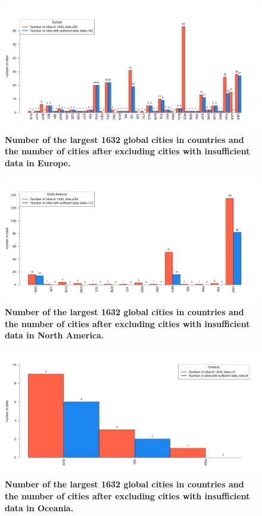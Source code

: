 \documentclass[preprint,10pt]{elsarticle} %
\begin{document}
\begin{figure}
\centering
\includegraphics[trim={ 0 35 25 50 },clip,scale=0.45]{Images/Europe_cities.png}
\caption{\bf Number of the largest 1632 global cities in countries and the number of cities after excluding cities with insufficient data in Europe.}
 \label{fig:europe}
\end{figure}

\begin{figure}
\centering
\includegraphics[trim={ 0 35 25 50 },clip,scale=0.45]{Images/North America_cities.png}
\caption{\bf Number of the largest 1632 global cities in countries and the number of cities after excluding cities with insufficient data in North America.}
 \label{fig:northamerica}
\end{figure}

\begin{figure}
\centering
\includegraphics[trim={ 0 35 25 50 },clip,scale=0.45]{Images/Oceania_cities.png}
\caption{\bf Number of the largest 1632 global cities in countries and the number of cities after excluding cities with insufficient data in Oceania.}
 \label{fig:oceania}
\end{figure}
\end{document}

